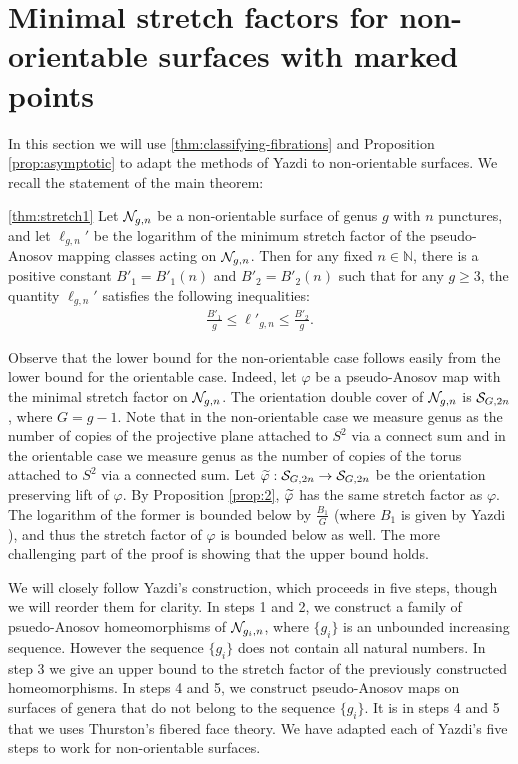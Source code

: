 \section{Minimal stretch factors for non-orientable surfaces with marked points}
\label{sec:application}

In this section we will use \autoref{thm:classifying-fibrations} and Proposition  \ref{prop:asymptotic} to adapt the methods of Yazdi \cite{yazdi2018pseudo} to non-orientable surfaces. We recall the statement of the main theorem:
\begin{manualtheorem}
  {\ref{thm:stretch1}}
Let $\mathcal{N}_{g,n}$ be a non-orientable surface of genus $g$ with $n$ punctures, and let $\ell_{g,n}'$ be the logarithm of
  the minimum stretch factor of the pseudo-Anosov mapping classes acting on $\mathcal{N}_{g,n}$.
  Then for any fixed $n \in \mathbb{N}$, there is a positive constant $B'_1 = B'_1(n)$ and $B'_2 = B'_2(n)$ such
  that for any $g \geq 3$,
  the quantity $\ell_{g,n}'$ satisfies the following inequalities:
  \begin{align*}
    \frac{B'_1}{g} \leq \ell'_{g,n} \leq \frac{B'_2}{g}.
  \end{align*}
\end{manualtheorem}

Observe that the lower bound for the non-orientable case follows easily from the lower bound for the orientable case.
Indeed, let $\varphi$ be a pseudo-Anosov map with the minimal stretch factor on $\mathcal{N}_{g,n}$. The orientation double cover of $\mathcal{N}_{g,n}$ is $\mathcal{S}_{G,2n}$, where $G = g-1$.  Note that in the non-orientable case we measure genus as the number of copies of the projective plane attached to $S^2$ via a connect sum and in the orientable case we measure genus as the number of copies of the torus attached to $S^2$ via a connected sum. Let $\widetilde{\varphi}:\mathcal{S}_{G, 2n}\to\mathcal{S}_{G,2n}$ be the orientation preserving lift of $\varphi$.
By Proposition \ref{prop:2}, $\widetilde{\varphi}$ has the same
stretch factor as $\varphi$. The logarithm of the former is bounded below by $\frac{B_1}{G}$ (where $B_1$ is given by Yazdi \cite{yazdi2018pseudo}), and thus the stretch factor of $\varphi$ is bounded
below as well. The more challenging part of the proof is showing that the upper bound holds.

We will closely follow Yazdi's construction, which proceeds in five steps, though we will reorder them for clarity.  In steps 1 and 2, we construct a family of psuedo-Anosov homeomorphisms
of $\mathcal{N}_{g_i,n}$, where $\{g_i\}$ is an unbounded increasing sequence. However the sequence $\{g_i\}$ does not contain all natural numbers.  In step 3 we give an upper bound to the stretch factor of the previously constructed homeomorphisms. In steps 4 and 5, we construct pseudo-Anosov maps on surfaces of genera that do not belong to the sequence $\{g_i\}$. It is in steps 4 and 5 that we uses
Thurston's fibered face theory. We have adapted  each of Yazdi's five steps to work for non-orientable surfaces.

